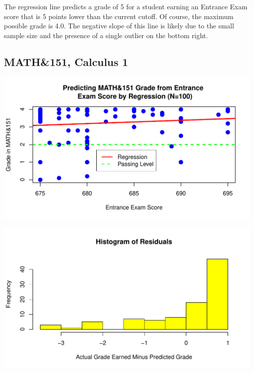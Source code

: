 \documentclass[twoside]{article}\usepackage[]{graphicx}\usepackage[]{color}
\makeatletter
\def\maxwidth{ %
  \ifdim\Gin@nat@width>\linewidth
    \linewidth
  \else
    \Gin@nat@width
  \fi
}
\newenvironment{knitrout}{}{} %
\makeatother
\begin{document}
The regression line predicts a grade of 5 for a student earning an Entrance Exam score that is 5 points lower than the current cutoff.  Of course, the maximum possible grade is 4.0.  The negative slope of this line is likely due to the small sample size and the presence of a single outlier on the bottom right.


\newpage
\subsection{MATH\&151, Calculus 1}



\begin{knitrout}
\color{fgcolor}
\includegraphics[width=\maxwidth]{figure/151regressiongraph-1} 

\end{knitrout}

\begin{knitrout}
\color{fgcolor}
\includegraphics[width=\maxwidth]{figure/151residualsplot-1} 

\end{knitrout}
\end{document}
